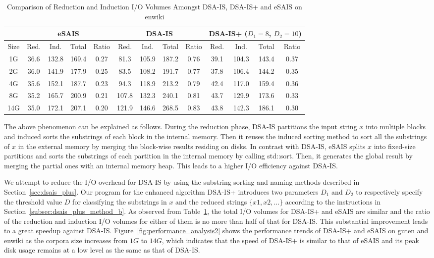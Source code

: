 \documentclass[10pt,journal,compsoc]{IEEEtran}
\begin{document}
\begin{table}%
	\caption{Comparison of Reduction and Induction I/O Volumes Amongst DSA-IS, DSA-IS+ and eSAIS on enwiki}
	\label{tbl:volume_cmp}
	\centering
	\begin{tabular}{|c|c|c|c|c|c|c|c|c|c|c|c|c|}
		\hline
		\multicolumn{1}{|c}{} & \multicolumn{4}{|c|}{eSAIS} & \multicolumn{4}{c|}{DSA-IS} & \multicolumn{4}{c|}{DSA-IS+ ($D_1 = 8$, $D_2 = 10$)}\\\hline
		\hline
		Size & Red. & Ind. & Total & Ratio & Red. & Ind. & Total & Ratio & Red. & Ind. & Total & Ratio\\\hline
		1G & 36.6 & 132.8 & 169.4 & 0.27 & 81.3 & 105.9 & 187.2 & 0.76 & 39.1 & 104.3 & 143.4 & 0.37\\\hline
		2G & 36.0 & 141.9 & 177.9 & 0.25 & 83.5 & 108.2 & 191.7 & 0.77 & 37.8 & 106.4 & 144.2 & 0.35\\\hline
		4G & 35.6 & 152.1 & 187.7 & 0.23 & 94.3 & 118.9 & 213.2 & 0.79 & 42.4 & 117.0 & 159.4 & 0.36\\\hline
		8G & 35.2 & 165.7 & 200.9 & 0.21 & 107.8 & 132.3 & 240.1 & 0.81 & 43.7 & 129.9 & 173.6 & 0.33\\\hline
		14G & 35.0 & 172.1 & 207.1 & 0.20 & 121.9 & 146.6 & 268.5 & 0.83 & 43.8 & 142.3 & 186.1 & 0.30\\\hline
	\end{tabular}
\end{table}%

The above phenomenon can be explained as follows. During the reduction phase, DSA-IS partitions the input string $x$ into multiple blocks and induced sorts the substrings of each block in the internal memory. Then it reuses the induced sorting method to sort all the substrings of $x$ in the external memory by merging the block-wise results residing on disks. In contrast with DSA-IS, eSAIS splits $x$ into fixed-size partitions and sorts the substrings of each partition in the internal memory by calling std::sort. Then, it generates the global result by merging the partial ones with an internal memory heap. This leads to a higher I/O efficiency against DSA-IS.

We attempt to reduce the I/O overhead for DSA-IS by using the substring sorting and naming methods described in Section~\ref{sec:dsais_plus}. Our program for the enhanced algorithm DSA-IS+ introduces two parameters $D_1$ and $D_2$ to respectively specify the threshold value $D$ for classifying the substrings in $x$ and the reduced strings $\{x1, x2, ...\}$ according to the instructions in Section~\ref{subsec:dsais_plus_method_b}. As observed from Table~\ref{tbl:volume_cmp}, the total I/O volumes for DSA-IS+ and eSAIS are similar and the ratio of the reduction and induction I/O volumes for either of them is no more than half of that for DSA-IS. This substantial improvement leads to a great speedup against DSA-IS. Figure~\ref{fig:performance_analysis2} shows the performance trends of DSA-IS+ and eSAIS on guten and enwiki as the corpora size increases from $1G$ to $14G$, which indicates that the speed of DSA-IS+ is similar to that of eSAIS and its peak disk usage remains at a low level as the same as that of DSA-IS.
\end{document}
